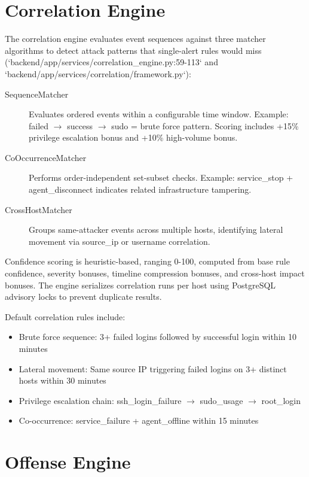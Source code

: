 \section{Correlation Engine}

The correlation engine evaluates event sequences against three matcher algorithms to detect attack patterns that single-alert rules would miss (`backend/app/services/correlation_engine.py:59-113` and `backend/app/services/correlation/framework.py`):

\begin{description}
    \item[SequenceMatcher] Evaluates ordered events within a configurable time window. Example: failed $\rightarrow$ success $\rightarrow$ sudo = brute force pattern. Scoring includes +15\% privilege escalation bonus and +10\% high-volume bonus.
    \item[CoOccurrenceMatcher] Performs order-independent set-subset checks. Example: service\_stop + agent\_disconnect indicates related infrastructure tampering.
    \item[CrossHostMatcher] Groups same-attacker events across multiple hosts, identifying lateral movement via source\_ip or username correlation.
\end{description}

Confidence scoring is heuristic-based, ranging 0-100, computed from base rule confidence, severity bonuses, timeline compression bonuses, and cross-host impact bonuses. The engine serializes correlation runs per host using PostgreSQL advisory locks to prevent duplicate results.

Default correlation rules include:
\begin{itemize}
    \item Brute force sequence: 3+ failed logins followed by successful login within 10 minutes
    \item Lateral movement: Same source IP triggering failed logins on 3+ distinct hosts within 30 minutes
    \item Privilege escalation chain: ssh\_login\_failure $\rightarrow$ sudo\_usage $\rightarrow$ root\_login
    \item Co-occurrence: service\_failure + agent\_offline within 15 minutes
\end{itemize}

\section{Offense Engine}

